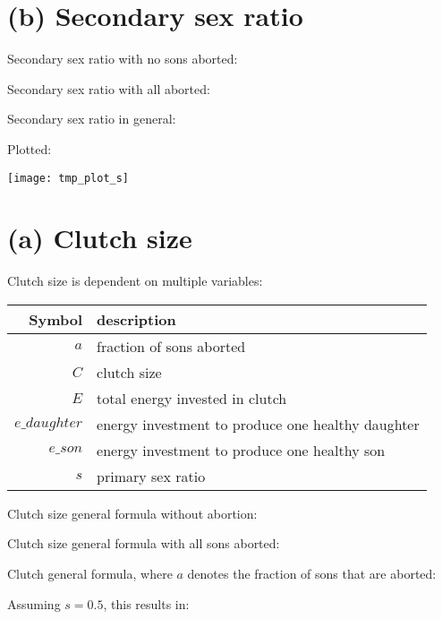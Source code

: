 \documentclass[11]{article}
\begin{document}
\section{(b) Secondary sex ratio}

Secondary sex ratio with no sons aborted:



Secondary sex ratio with all aborted:



Secondary sex ratio in general:



Plotted:

\texttt{[image: tmp\_plot\_s]}










\section{(a) Clutch size}

Clutch size is dependent on multiple variables:

\bigskip

\begin{tabular}{ | r | l | }
  \hline
  Symbol & description \\ 
  \hline
  $a$ & fraction of sons aborted \\
  $C$ & clutch size \\
  $E$ & total energy invested in clutch \\
  $e\_daughter$ & energy investment to produce one healthy daughter \\
  $e\_son$ & energy investment to produce one healthy son \\
  $s$ & primary sex ratio \\
  \hline
\end{tabular}

\bigskip

Clutch size general formula without abortion:



Clutch size general formula with all sons aborted:



Clutch general formula, where $a$ denotes the fraction of sons that are aborted:



Assuming $s=0.5$, this results in:


\end{document}

